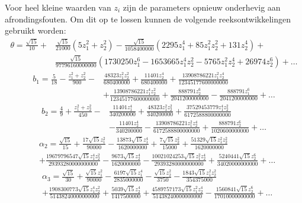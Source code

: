 \documentclass[12pt]{article}
\begin{document}
Voor heel kleine waarden van \(z_i\) zijn de parameters opnieuw onderhevig aan afrondingsfouten. Om dit op te lossen kunnen de volgende reeksontwikkelingen gebruikt worden:
\begin{equation} \label{eq:thetas3series}
\begin{split}
    \theta=\frac{\sqrt{15}}{10}+&\frac{\sqrt{15}}{21000}(5z_1^2+z_2^2)-\frac{\sqrt{15}}{1058400000}(2295z_1^4+85z_1^2z_2^2+131z_2^4)+ \\
    &\frac{\sqrt{15}}{97796160000000}(1730250z_1^6-1653665z_1^4z_2^2-5765z_1^2z_2^4+26974z_2^6)+\dots
\end{split}
\end{equation}
\begin{equation} \label{eq:b1s3series}
\begin{split}
    b_1=\frac{5}{18}-\frac{z_1^2+z_2^2}{900}-&\frac{48323z_1^2z_2^2}{680400000}+\frac{11401z_2^4}{680400000}+\frac{13908786221z_1^2z_2^4}{12345177600000000}\\&+\frac{13908786221z_1^4z_2^2}{12345177600000000}+\frac{888791z_2^6}{2041200000000}-\frac{888791z_1^6}{2041200000000}+\dots
\end{split}
\end{equation}
\begin{equation} \label{eq:b2s3series}
\begin{split}
    b_2=\frac{4}{9}+\frac{z_1^2+z_2^2}{450}-&\frac{11401z_1^4}{340200000}+\frac{48323z_1^2z_2^2}{340200000}+\frac{37529453779z_1^4z_2^2}{6172588800000000}\\&-\frac{11401z_2^4}{340200000}-\frac{13908786221z_1^2z_2^4}{6172588800000000}+\frac{888791z_2^6}{1020600000000}+\dots
\end{split}
\end{equation}
\begin{equation} \label{eq:alpha2s3series}
\begin{split}
    &\alpha_2=\frac{\sqrt{15}}{15}+\frac{17\sqrt{15}z_1^2}{90000}-\frac{13873\sqrt{15}z_1^4}{1620000000}+\frac{7\sqrt{15}z_2^2}{15000}+\frac{51329\sqrt{15}z_1^2z_2^2}{1620000000}\\&+\frac{19679796547\sqrt{15}z_1^4z_2^2}{29393280000000000}-\frac{9673\sqrt{15}z_2^4}{1620000000}-\frac{10021024253\sqrt{15}z_1^2z_2^4}{29393280000000000}+\frac{5240441\sqrt{15}z_2^6}{34020000000000}+\dots
\end{split}
\end{equation}
\begin{equation} \label{eq:alpha3s3series}
\begin{split}
    &\alpha_3=\frac{\sqrt{15}}{30}+\frac{\sqrt{15}z_1^2}{90000}-\frac{6197\sqrt{15}z_1^4}{2835000000}-\frac{\sqrt{15}z_2^2}{3750}-\frac{1843\sqrt{15}z_1^2z_2^2}{354375000}\\&+\frac{1908300773\sqrt{15}z_1^4z_2^2}{51438240000000000}+\frac{5039\sqrt{15}z_2^4}{1417500000}+\frac{4589757173\sqrt{15}z_1^2z_2^4}{51438240000000000}-\frac{1560841\sqrt{15}z_2^6}{17010000000000}+\dots
\end{split}
\end{equation}
\end{document}
